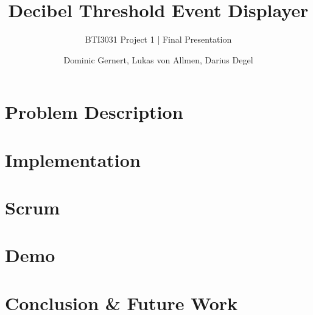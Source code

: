 \documentclass[authorontitle=true]{bfhbeamer}
\title{Decibel Threshold Event Displayer}
\subtitle{BTI3031 Project 1 | Final Presentation}
\author{Dominic Gernert, Lukas von Allmen, Darius Degel}
\begin{document}
\maketitle
\section{Problem Description}\label{sec:problem-description}

\section{Implementation}\label{sec:implementation}

\section{Scrum}\label{sec:scrum}

\section{Demo}\label{sec:demo}

\section{Conclusion \& Future Work}\label{sec:conclusion}

\end{document}
